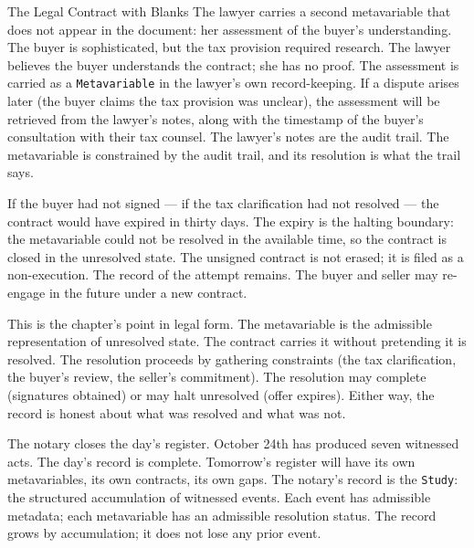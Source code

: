 \begin{coda}{The Legal Contract with Blanks}
The lawyer carries a second metavariable that does not appear in the
document: her assessment of the buyer's understanding. The buyer is
sophisticated, but the tax provision required research. The lawyer
believes the buyer understands the contract; she has no proof. The
assessment is carried as a \texttt{Metavariable} in the lawyer's own
record-keeping. If a dispute arises later (the buyer claims the tax
provision was unclear), the assessment will be retrieved from the
lawyer's notes, along with the timestamp of the buyer's
consultation with their tax counsel. The lawyer's notes are the
audit trail. The metavariable is constrained by the audit trail, and
its resolution is what the trail says.

If the buyer had not signed --- if the tax clarification had not
resolved --- the contract would have expired in thirty days. The
expiry is the halting boundary: the metavariable could not be
resolved in the available time, so the contract is closed in the
unresolved state. The unsigned contract is not erased; it is filed
as a non-execution. The record of the attempt remains. The buyer and
seller may re-engage in the future under a new contract.

This is the chapter's point in legal form. The metavariable is the
admissible representation of unresolved state. The contract carries
it without pretending it is resolved. The resolution proceeds by
gathering constraints (the tax clarification, the buyer's review,
the seller's commitment). The resolution may complete (signatures
obtained) or may halt unresolved (offer expires). Either way, the
record is honest about what was resolved and what was not.

The notary closes the day's register. October 24th has produced
seven witnessed acts. The day's record is complete. Tomorrow's
register will have its own metavariables, its own contracts, its own
gaps. The notary's record is the \texttt{Study}: the structured
accumulation of witnessed events. Each event has admissible
metadata; each metavariable has an admissible resolution status. The
record grows by accumulation; it does not lose any prior event.

\end{coda}

